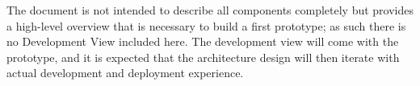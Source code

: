 \documentclass[a4paper,11pt]{esiwace-modified}
\begin{document}
The document is not intended to describe all components completely but provides a high-level overview that is necessary to build a first prototype; as such there is no Development View included here.
The development view will come with the prototype, and it is expected that the architecture design will then iterate with actual development and deployment experience.











%

\label{sec:references}




\end{document}
